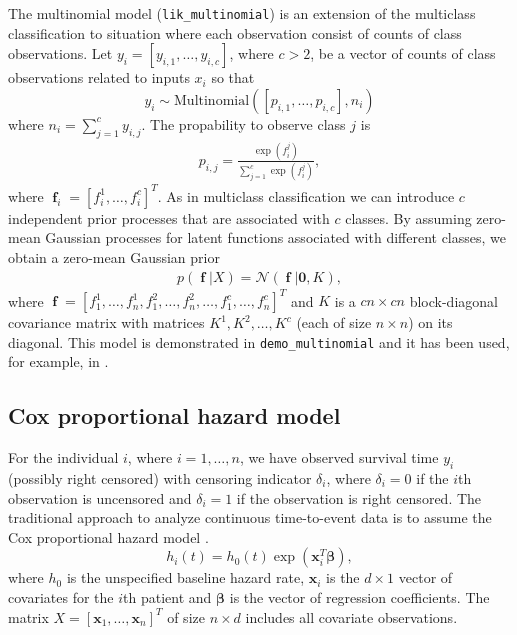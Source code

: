 \documentclass[twoside,11pt]{article}
\DeclareMathOperator{\f}{\mathbf{f}}
\newcommand{\code}[1]{{\normalfont\texttt{#1}}}
\begin{document}
The multinomial model (\code{lik\_multinomial}) is an extension of the
multiclass classification to situation where each observation consist
of counts of class observations. Let $y_i = [y_{i,1},\ldots,y_{i,c}]$,
where $c>2$, be a vector of counts of class observations related to
inputs $x_i$ so that
%
\begin{equation}
y_i \sim \text{Multinomial}([p_{i,1},\ldots,p_{i,c}],n_i)
\end{equation}
%
where $n_i=\sum_{j=1}^c y_{i,j}$. The propability to observe class $j$ is
%
\begin{eqnarray}
p_{i,j}=\frac{\exp(f_i^j)}{\sum_{j=1}^c\exp(f_i^j)},
\end{eqnarray}
%
where $\f_i=\left[f_i^1,\ldots,f_i^c\right]^T$. As in multiclass
classification we can introduce $c$ independent prior processes that
are associated with $c$ classes.
%
By assuming zero-mean Gaussian processes for latent functions
associated with different classes, we obtain a zero-mean Gaussian
prior
\begin{eqnarray}
  p(\f|X)=\mathcal{N}(\f|\mathbf{0}, K),
\end{eqnarray}
where
$\f=\left[f_1^1,\ldots,f_n^1,f_1^2,\ldots,f_n^2,\ldots,f_1^c,\ldots,f_n^c\right]^T$
and $K$ is a $cn \times cn$ block-diagonal covariance matrix with
matrices $K^1, K^2,\ldots,K^c$ (each of size $n \times n$) on its
diagonal. This model is demonstrated in \code{demo\_multinomial} and
it has been used, for example, in
\citep{Juntunen+Vanhatalo+Peltonen+Mantyniemi:2012}.

\subsection{Cox proportional hazard model}

For the individual $i$, where $i=1,\ldots,n$, we have observed
survival time $y_i$ (possibly right censored) with censoring indicator
$\delta_i$, where $\delta_i=0$ if the $i$th observation is uncensored
and $\delta_i=1$ if the observation is right censored. The traditional
approach to analyze continuous time-to-event data is to assume the Cox
proportional hazard model \citep{Cox:1972}.
\begin{equation}
h_i(t)=h_0(t)\exp(\bm{x}^T_i\bm{\beta}),
\end{equation}
where $h_0$ is the unspecified baseline hazard rate, $\bm{x}_i$ is the
$d\times1$ vector of covariates for the $i$th patient and $\bm{\beta}$
is the vector of regression coefficients. The matrix
$X=[\bm{x}_1,\ldots,\bm{x}_n]^T$ of size $n\times d$ includes all
covariate observations.
\end{document}
